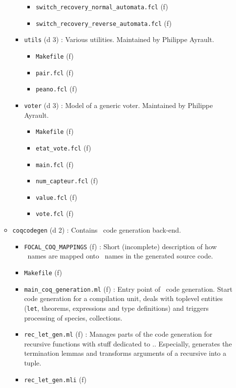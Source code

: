\begin{itemize}
\begin{itemize}
\begin{itemize}
\begin{itemize}
      \item {\tt switch\_recovery\_normal\_automata.fcl} (f)
      \item {\tt switch\_recovery\_reverse\_automata.fcl} (f)
      \end{itemize}
    \item {\tt utils} (d 3) : Various utilities. Maintained by Philippe
      Ayrault.
      \begin{itemize}
      \item {\tt Makefile} (f)
      \item {\tt pair.fcl} (f)
      \item {\tt peano.fcl} (f)
      \end{itemize}
    \item {\tt voter} (d 3) : Model of a generic voter. Maintained by
      Philippe Ayrault.
      \begin{itemize}
      \item {\tt Makefile} (f)
      \item {\tt etat\_vote.fcl} (f)
      \item {\tt main.fcl} (f)
      \item {\tt num\_capteur.fcl} (f)
      \item {\tt value.fcl} (f)
      \item {\tt vote.fcl} (f)
      \end{itemize}
    \end{itemize}
  \item {\tt coqcodegen} (d 2) : Contains \coq\ code generation back-end.
    \begin{itemize}
    \item {\tt FOCAL\_COQ\_MAPPINGS} (f) : Short (incomplete) description
      of how \focalize\ names are mapped onto \coq\ names in the
      generated source code.
    \item {\tt Makefile} (f)
    \item {\tt main\_coq\_generation.ml} (f) : Entry point of \coq\ code
      generation. Start code generation for a compilation unit, deals
      with toplevel entities ({\tt let}, theorems, expressions and
      type definitions) and triggers processing of species,
      collections.
    \item {\tt rec\_let\_gen.ml} (f) : Manages parts of the code
      generation for recursive functions with stuff dedicated to
      \coq.. Especially, generates the termination lemmas and
      transforms arguments of a recursive into a tuple.
    \item {\tt rec\_let\_gen.mli} (f)

\end{itemize}
\end{itemize}
\end{itemize}
